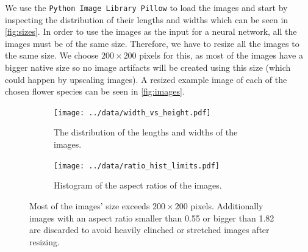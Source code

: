 We use the \texttt{Python Image Library Pillow} \cite{pillow} to load the images and start by inspecting the distribution of their lengths and widths which can be seen in \autoref{fig:sizes}.
In order to use the images as the input for a neural network, all the images must be of the same size. 
Therefore, we have to resize all the images to the same size.
We choose $200\times200$ pixels for this, as most of the images have a bigger native size so no image artifacts will be created using this size (which could happen by upscaling images).
A resized example image of each of the chosen flower species can be seen in \autoref{fig:images}.
\begin{figure}
    \centering    
    \begin{subfigure}{0.49\textwidth}
        \centering
        \texttt{[image: ../data/width\_vs\_height.pdf]}
        \caption{The distribution of the lengths and widths of the images.}
        \label{fig:sizes}
    \end{subfigure}
    \hfill
    \begin{subfigure}{0.49\textwidth}
        \centering
        \texttt{[image: ../data/ratio\_hist\_limits.pdf]}
        \caption{Histogram of the aspect ratios of the images.}
        \label{fig:ratio}
    \end{subfigure}
    \caption{Most of the images' size exceeds $200\times200$ pixels. 
        Additionally images with an aspect ratio smaller than 0.55 or bigger than 1.82 are discarded to avoid heavily clinched or stretched images after resizing. }
\end{figure}
